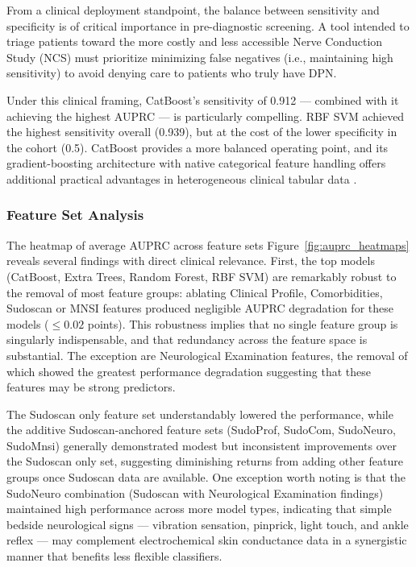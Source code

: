 \documentclass[pdflatex,sn-vancouver-num]{sn-jnl}
\begin{document}
From a clinical deployment standpoint, the balance between sensitivity and specificity is of critical importance in pre-diagnostic screening. A tool intended to triage patients toward the more costly and less accessible Nerve Conduction Study (NCS) must prioritize minimizing false negatives (i.e., maintaining high sensitivity) to avoid denying care to patients who truly have DPN. 

Under this clinical framing, CatBoost's sensitivity of 0.912 — combined with it achieving the highest AUPRC — is particularly compelling. RBF SVM achieved the highest sensitivity overall (0.939), but at the cost of the lower specificity in the cohort (0.5). CatBoost provides a more balanced operating point, and its gradient-boosting architecture with native categorical feature handling offers additional practical advantages in heterogeneous clinical tabular data \cite{dorogush2018catboost}.

\subsubsection{Feature Set Analysis}
The heatmap of average AUPRC across feature sets Figure~\ref{fig:auprc_heatmaps} reveals several findings with direct clinical relevance. First, the top models (CatBoost, Extra Trees, Random Forest, RBF SVM) are remarkably robust to the removal of most feature groups: ablating Clinical Profile, Comorbidities, Sudoscan or MNSI features produced negligible AUPRC degradation for these models ($\le 0.02$ points). This robustness implies that no single feature group is singularly indispensable, and that redundancy across the feature space is substantial. The exception are Neurological Examination features, the removal of which showed the greatest performance degradation suggesting that these features may be strong predictors. 

The Sudoscan only feature set understandably lowered the performance, while the additive Sudoscan-anchored feature sets (SudoProf, SudoCom, SudoNeuro, SudoMnsi) generally demonstrated modest but inconsistent improvements over the Sudoscan only set, suggesting diminishing returns from adding other feature groups once Sudoscan data are available. 
One exception worth noting is that the SudoNeuro combination (Sudoscan with Neurological Examination findings) maintained high performance across more model types, indicating that simple bedside neurological signs — vibration sensation, pinprick, light touch, and ankle reflex — may complement electrochemical skin conductance data in a synergistic manner that benefits less flexible classifiers.
\end{document}
